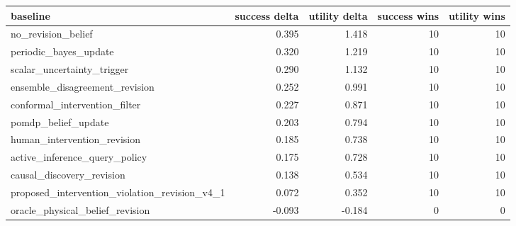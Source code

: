 \begin{tabular}{lrrrr}
\toprule
baseline & success delta & utility delta & success wins & utility wins \\
\midrule
no\_revision\_belief & 0.395 & 1.418 & 10 & 10 \\
periodic\_bayes\_update & 0.320 & 1.219 & 10 & 10 \\
scalar\_uncertainty\_trigger & 0.290 & 1.132 & 10 & 10 \\
ensemble\_disagreement\_revision & 0.252 & 0.991 & 10 & 10 \\
conformal\_intervention\_filter & 0.227 & 0.871 & 10 & 10 \\
pomdp\_belief\_update & 0.203 & 0.794 & 10 & 10 \\
human\_intervention\_revision & 0.185 & 0.738 & 10 & 10 \\
active\_inference\_query\_policy & 0.175 & 0.728 & 10 & 10 \\
causal\_discovery\_revision & 0.138 & 0.534 & 10 & 10 \\
proposed\_intervention\_violation\_revision\_v4\_1 & 0.072 & 0.352 & 10 & 10 \\
oracle\_physical\_belief\_revision & -0.093 & -0.184 & 0 & 0 \\
\bottomrule
\end{tabular}
